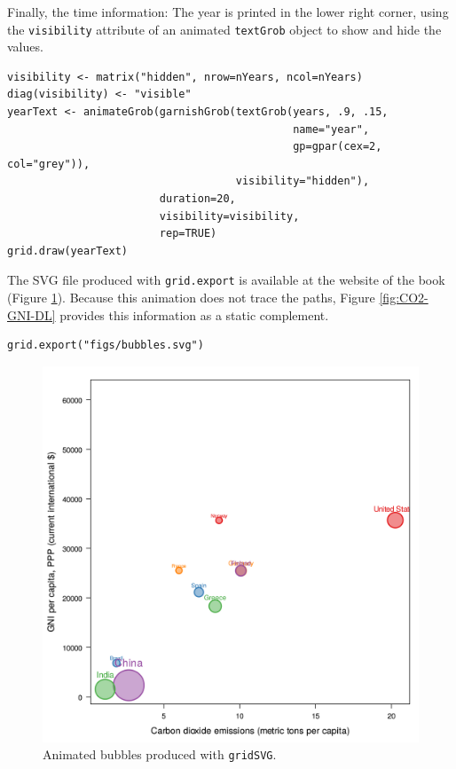 \documentclass[smallroyalvopaper]{memoir}
\begin{document}
Finally, the time information: The year is printed in the lower
right corner, using the \texttt{visibility} attribute of an animated
\texttt{textGrob} object to show and hide the values.
\lstset{language=R,numbers=none}
\begin{lstlisting}
visibility <- matrix("hidden", nrow=nYears, ncol=nYears)
diag(visibility) <- "visible"
yearText <- animateGrob(garnishGrob(textGrob(years, .9, .15,
                                             name="year",
                                             gp=gpar(cex=2, col="grey")),
                                    visibility="hidden"),
                        duration=20,
                        visibility=visibility,
                        rep=TRUE)
grid.draw(yearText)
\end{lstlisting}

The SVG file produced with \texttt{grid.export} is available at the website
of the book (Figure \ref{fig:bubblesSVG}). Because this animation does
not trace the paths, Figure \ref{fig:CO2-GNI-DL} provides this
information as a static complement.


\lstset{language=R,numbers=none}
\begin{lstlisting}
grid.export("figs/bubbles.svg")
\end{lstlisting}

\begin{figure}
  \centering
  \includegraphics[width=\textwidth]{figs/bubbles.png}
  \caption{Animated bubbles produced with \texttt{gridSVG}.}
  \label{fig:bubblesSVG}
\end{figure}
\end{document}
